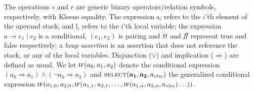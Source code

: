 \documentclass[10pt,twocolumn]{article}
\newcommand{\AND}{\wedge}
\newcommand{\IF}{\mbox{\sc if}}
\newcommand{\SELECT}{\mbox{\sc select}}
\newcommand{\True}{\mbox{\it tt}}
\newcommand{\False}{\mbox{\it  ff}}
\newcommand{\Stack}{\mathrm{s}}
\newcommand{\BinOp}{\circ}
\newcommand{\BinRel}{\mathit{r}}
\newcommand{\Local}{\mathrm{l}}
\begin{document}
The operations $\BinOp$ and $\BinRel$ are generic binary operators/relation symbols, respectively, with Kleene equality. The expression $\Stack_i$ refers to the $i$'th element of the operand stack, and $\Local_i$ refers to the $i$'th local variable; the expression $a \rightarrow e_1 \mid e_2$ is a conditional, $(e_1,e_2)$ is pairing and $\True$ and $\False$ represent true and false respectively; a {\em heap assertion} is an assertion that does not reference the stack, or any of the local variables. Disjunction ($\vee$) and implication ($\Rightarrow$) are defined as usual. We let $ \IF(a_0, a_1, a_2) $ denote the conditional expression $ (a_0 \Rightarrow a_1) \AND (\neg a_0 \Rightarrow a_2) $ and $\SELECT(\mathbf{a_1}, \mathbf{a_2}, a_{\it else})$ the generalized conditional expression $\IF(a_{1,0}, a_{2,0}, \IF(a_{1,1}, a_{2,1}, \ldots, \IF(a_{1,n}, a_{2,n}, a_{\it else})\ldots))$.
\end{document}
